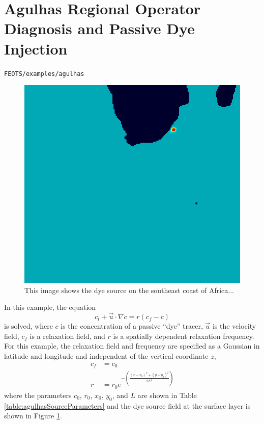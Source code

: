 \documentclass{softwaremanual}
\begin{document}
\section{Agulhas Regional Operator Diagnosis and Passive Dye Injection}
\begin{center}
\texttt{FEOTS/examples/agulhas}
\end{center}
\begin{figure}[t!]
\centering
\includegraphics[width=0.75\linewidth,natwidth=600,natheight=549]{agulhas_local_sourcespot.png}
\caption{This image shows the dye source on the southeast coast of Africa...}\label{fig:agulhasSource}
\end{figure}
In this example, the equation
\begin{equation}
 c_t + \vec{u} \cdot \nabla c = r( c_f - c )
\end{equation}
is solved, where $c$ is the concentration of a passive ``dye'' tracer, $\vec{u}$ is the velocity field, $c_f$ is a relaxation field, and $r$ is a spatially dependent relaxation frequency. For this example, the relaxation field and frequency are specified as a Gaussian in latitude and longitude and independent of the vertical coordinate $z$,
\begin{subequations}
\begin{align}
  c_f &= c_0 \\
  r   &= r_0 e^{ -\left( \frac{ (x-x_0)^2 + (y-y_0)^2 }{2 L^2 }\right)}
\end{align}
\end{subequations}
where the parameters $c_0$, $r_0$, $x_0$, $y_0$, and $L$ are shown in Table \ref{table:agulhasSourceParameters} and the dye source field at the surface layer is shown in Figure \ref{fig:agulhasSource}.
\end{document}
